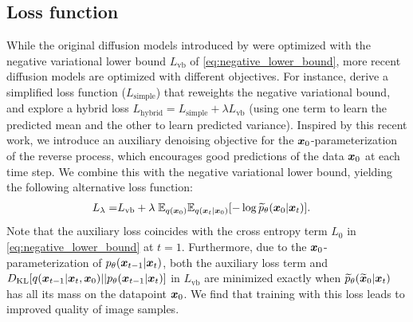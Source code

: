 \subsection{Loss function}
While the original diffusion models introduced by \citet{sohl2015deep} were optimized with the negative variational lower bound $L_{\mathrm{vb}}$ of \eqref{eq:negative_lower_bound}, more recent diffusion models are optimized with different objectives.
For instance, \citet{ho2020denoising} derive a simplified loss function ($L_{\mathrm{simple}}$) that reweights the negative variational bound, and  \citet{nichol2021improved} explore a hybrid loss $L_{\mathrm{hybrid}} = L_{\mathrm{simple}} + \lambda L_{\mathrm{vb}}$ (using one term to learn the predicted mean and the other to learn predicted variance).
Inspired by this recent work, we introduce an auxiliary denoising objective for the $\boldsymbol{x}_0$-parameterization of the reverse process, which encourages good predictions of the data $\boldsymbol{x}_0$ at each time step. 
We combine this with the negative variational lower bound, yielding the following alternative loss function:
\begin{align}
    L_{\lambda} =& L_{\mathrm{vb}} + \lambda \; \mathbb E_{q(\boldsymbol{x}_0)}\mathbb E_{q(\boldsymbol{x}_t|\boldsymbol{x}_0)}[-\log \widetilde p_{\theta}(\boldsymbol{x}_0|\boldsymbol{x}_t)].
    \label{eq:alternative_loss}
\end{align}
Note that the auxiliary loss coincides with the cross entropy term $L_0$ in \eqref{eq:negative_lower_bound} at $t=1$. Furthermore, due to the $\boldsymbol{x}_0$-parameterization of $p_{\theta}(\boldsymbol{x}_{t-1}|\boldsymbol{x}_t)$, both the auxiliary loss term and $D_{\mathrm{KL}}[q(\boldsymbol{x}_{t-1} | \boldsymbol{x}_t, \boldsymbol{x}_0) \vert\vert p_{\theta}(\boldsymbol{x}_{t-1}|\boldsymbol{x}_t)]$ in $L_{\mathrm{vb}}$ are minimized exactly when $\widetilde p_{\theta}(\widetilde{\boldsymbol{x}}_0|\boldsymbol{x}_t)$ has all its mass on the datapoint $\boldsymbol{x}_0$.
We find that training with this loss leads to improved quality of image samples. 